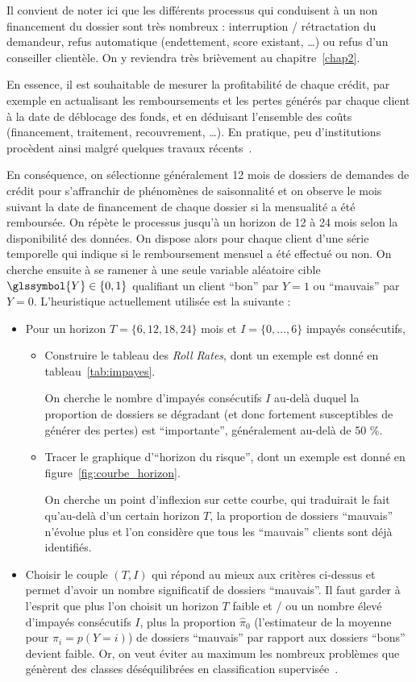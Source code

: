 Il convient de noter ici que les différents processus qui conduisent à un non financement du dossier sont très nombreux : interruption / rétractation du demandeur, refus automatique (endettement, \gls{score} existant, \dots) ou refus d'un conseiller clientèle. On y reviendra très brièvement au chapitre~\ref{chap2}.

En essence, il est souhaitable de mesurer la profitabilité de chaque crédit, par exemple en actualisant les remboursements et les pertes générés par chaque client à la date de déblocage des fonds, et en déduisant l'ensemble des coûts (financement, traitement, recouvrement, \dots). En pratique, peu d'institutions procèdent ainsi malgré quelques travaux récents~\cite{finlay2010credit}.

En conséquence, on sélectionne généralement 12 mois de dossiers de demandes de crédit pour s'affranchir de phénomènes de saisonnalité et on observe le mois suivant la date de financement de chaque dossier si la mensualité a été remboursée. On répète le processus jusqu'à un horizon de 12 à 24 mois selon la disponibilité des données. On dispose alors pour chaque client d'une série temporelle qui indique si le remboursement mensuel a été effectué ou non. On cherche ensuite à se ramener à une seule variable aléatoire cible $\glssymbol{Y} \in \{0,1\}$ qualifiant un client ``bon'' par $Y=1$ ou ``mauvais'' par $Y=0$. L'heuristique actuellement utilisée est la suivante :
\begin{itemize}
\item Pour un horizon $T=\{6,12,18,24\}$ mois et $I = \{0,\dots,6\}$ impayés consécutifs,
\begin{itemize}
\item Construire le tableau des \textit{Roll Rates}, dont un exemple est donné en tableau~\ref{tab:impayes}.

On cherche le nombre d'impayés consécutifs $I$ au-delà duquel la proportion de dossiers se dégradant (et donc fortement susceptibles de générer des pertes) est ``importante'', généralement au-delà de 50 \%. 
\item Tracer le graphique d'``horizon du risque'', dont un exemple est donné en figure~\ref{fig:courbe_horizon}.

On cherche un point d'inflexion sur cette courbe, qui traduirait le fait qu'au-delà d'un certain horizon $T$, la proportion de dossiers ``mauvais'' n'évolue plus et l'on considère que tous les ``mauvais'' clients sont déjà identifiés.
\end{itemize}
\item Choisir le couple $(T,I)$ qui répond au mieux aux critères ci-dessus et permet d'avoir un nombre significatif de dossiers ``mauvais''. Il faut garder à l'esprit que plus l'on choisit un horizon $T$ faible et / ou un nombre élevé d'impayés consécutifs $I$, plus la proportion $\hat{\pi}_0$ (l'estimateur de la moyenne pour $\pi_i = p(Y=i)$) de dossiers ``mauvais'' par rapport aux dossiers ``bons'' devient faible.
Or, on veut éviter au maximum les nombreux problèmes que génèrent des classes déséquilibrées en classification supervisée~\cite{sun2009classification}.
\end{itemize}

